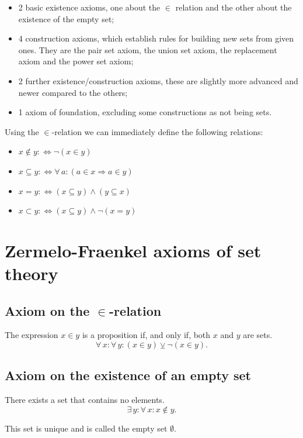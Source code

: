 \documentclass[root.tex]{subfiles}
\begin{document}
\begin{itemize}
\item 2 basic existence axioms, one about the $\in$ relation and the other about the existence of the empty set;
\item 4 construction axioms, which establish rules for building new sets from given ones.
They are the pair set axiom, the union set axiom, the replacement axiom and the power set axiom; 
\item 2 further existence/construction axioms, these are slightly more advanced and newer compared to the others;
\item 1 axiom of foundation, excluding some constructions as not being sets.
\end{itemize}
Using the $\in$-relation we can immediately define the following relations:
\begin{itemize}
  \item $x\notin y :\Leftrightarrow \neg(x\in y)$
  \item $x\subseteq y :\Leftrightarrow \forall \, a : (a\in x \Rightarrow a\in y)$
\item $x = y :\Leftrightarrow (x\subseteq y) \land (y\subseteq x)$
\item $x \subset y :\Leftrightarrow (x \subseteq y) \land \neg (x = y)$
\end{itemize}

\section{Zermelo-Fraenkel axioms of set theory}%

\subsection{Axiom on the $\in$-relation} 
The expression $x\in y$ is a proposition if, and only if, both $x$ and $y$ are sets.
$$
\forall \, x : \forall \, y : (x\in y) \veebar \neg (x\in y).
$$

\subsection{Axiom on the existence of an empty set}
There exists a set that contains no elements. $$
\exists \, y : \forall \, x : x \notin y .
$$

\begin{theorem}
This set is unique and is called the empty set $\emptyset$.
\end{theorem}
\end{document}
